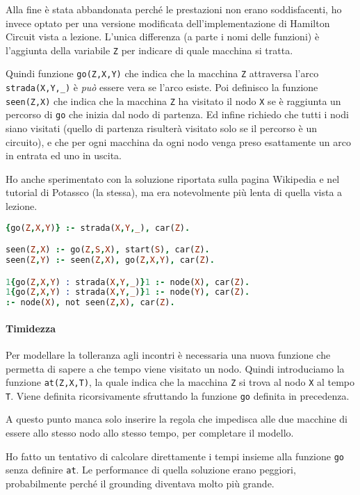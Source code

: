 \documentclass[11pt, a4paper]{article}
\begin{document}
Alla fine è stata abbandonata perché le prestazioni non erano soddisfacenti, ho invece optato per una versione modificata dell'implementazione di Hamilton Circuit vista a lezione.
L'unica differenza (a parte i nomi delle funzioni) è l'aggiunta della variabile \lstinline{Z} per indicare di quale macchina si tratta.

Quindi funzione \lstinline{go(Z,X,Y)} che indica che la macchina \lstinline{Z} attraversa l'arco \lstinline{strada(X,Y,_)} è \emph{può} essere vera se l'arco esiste.
Poi definisco la funzione \lstinline{seen(Z,X)} che indica che la macchina \lstinline{Z} ha visitato il nodo \lstinline{X} se è raggiunta un percorso di \lstinline{go} che inizia dal nodo di partenza.
Ed infine richiedo che tutti i nodi siano visitati (quello di partenza risulterà visitato solo se il percorso è un circuito), e che per ogni macchina da ogni nodo venga preso esattamente un arco in entrata ed uno in uscita.

Ho anche sperimentato con la soluzione riportata sulla pagina Wikipedia e nel tutorial di Potassco (la stessa), ma era notevolmente più lenta di quella vista a lezione.

\begin{lstlisting}[language=prolog]
{go(Z,X,Y)} :- strada(X,Y,_), car(Z).

seen(Z,X) :- go(Z,S,X), start(S), car(Z).
seen(Z,Y) :- seen(Z,X), go(Z,X,Y), car(Z).

1{go(Z,X,Y) : strada(X,Y,_)}1 :- node(X), car(Z).
1{go(Z,X,Y) : strada(X,Y,_)}1 :- node(Y), car(Z).
:- node(X), not seen(Z,X), car(Z).
\end{lstlisting}

\paragraph{Timidezza}
Per modellare la tolleranza agli incontri è necessaria una nuova funzione che permetta di sapere a che tempo viene visitato un nodo.
Quindi introduciamo la funzione \lstinline{at(Z,X,T)}, la quale indica che la macchina \lstinline{Z} si trova al nodo \lstinline{X} al tempo \lstinline{T}.
Viene definita ricorsivamente sfruttando la funzione \lstinline{go} definita in precedenza.

A questo punto manca solo inserire la regola che impedisca alle due macchine di essere allo stesso nodo allo stesso tempo, per completare il modello.

Ho fatto un tentativo di calcolare direttamente i tempi insieme alla funzione \lstinline{go} senza definire \lstinline{at}. Le performance di quella soluzione erano peggiori, probabilmente perché il grounding diventava molto più grande.
\end{document}
